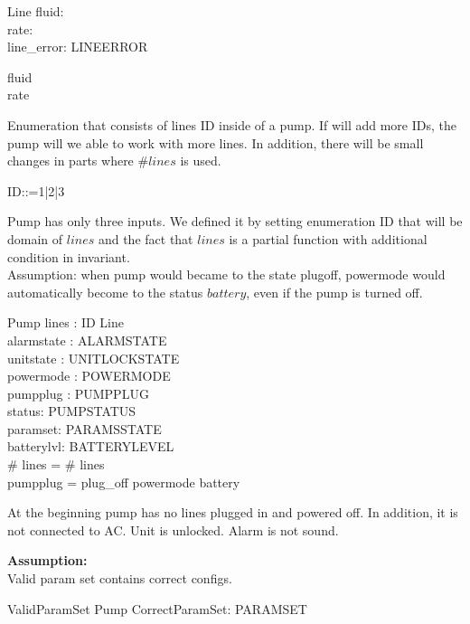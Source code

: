 \documentclass{article}
\begin{document}
	\begin{schema}{Line}
		fluid: \nat \\
		rate: \nat \\
		line\_error: LINEERROR
	\where

	
		fluid  \\ 
		rate 
	\end{schema}
	
	Enumeration that consists of lines ID inside of a pump. If will add more IDs, the pump will we able to work with more lines. In addition, there will be small changes in parts where $\# lines$ is used.
	\begin{zed}
		ID::=1|2|3
	\end{zed}
	
	Pump has only three inputs. We defined it by setting enumeration ID that will be domain of $lines$ and the fact that $lines$ is a partial function with additional condition in invariant.\\
		Assumption: when pump would became to the state plugoff, powermode would automatically become to the status $battery$, even if the pump is turned off. 
	

	\begin{schema}{Pump}
		lines : ID \pfun Line \\
		alarmstate : ALARMSTATE \\
		unitstate : UNITLOCKSTATE \\
		powermode : POWERMODE \\
		pumpplug : PUMPPLUG \\
		status: PUMPSTATUS \\
		paramset: PARAMSSTATE \\
		batterylvl: BATTERYLEVEL\\
		
	\where
		\# \ran lines = \# \dom lines \\
		pumpplug = plug\_off \implies powermode \neq battery 
	\end{schema}
	
	
	At the beginning pump has no lines plugged in and powered off. In addition, it is not connected to AC. Unit is unlocked. Alarm is not sound. 
	
	\textbf{Assumption:}\\
	Valid param set contains correct configs.
		
			\begin{schema}{ValidParamSet}
				Pump
			CorrectParamSet: \power PARAMSET
				
			\end{schema}
		
\end{document}
